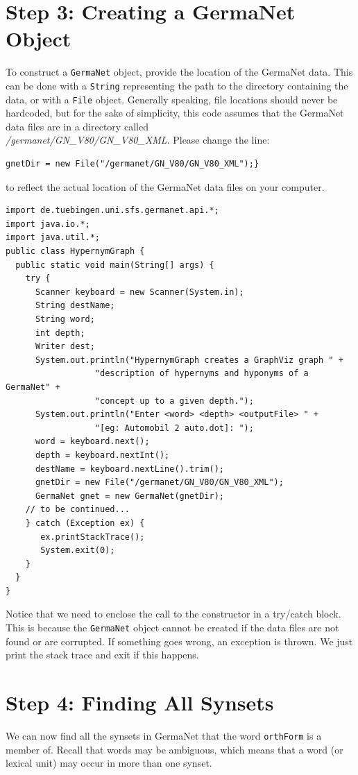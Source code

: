 \documentclass[12pt,a4paper,english,utf8]{report}
\begin{document}
\section{Step 3: Creating a GermaNet Object}
To construct a \texttt{GermaNet} object, provide the location of the GermaNet data. This can be done with a \texttt{String} representing the path to the directory containing the data, or with a \texttt{File} object. Generally speaking, file locations should never be hardcoded, but for the sake of simplicity, this code assumes that the GermaNet data files are in a directory called \\ \emph{/germanet/GN\_V80/GN\_V80\_XML}. Please change the line:

\begin{lstlisting}
gnetDir = new File("/germanet/GN_V80/GN_V80_XML");}
\end{lstlisting}

to reflect the actual location of the GermaNet data files on your computer.

\begin{lstlisting}
import de.tuebingen.uni.sfs.germanet.api.*;
import java.io.*;
import java.util.*;
public class HypernymGraph {
  public static void main(String[] args) {
    try {
      Scanner keyboard = new Scanner(System.in);
      String destName;
      String word;
      int depth;
      Writer dest;
      System.out.println("HypernymGraph creates a GraphViz graph " +
                  "description of hypernyms and hyponyms of a GermaNet" +
                  "concept up to a given depth.");
      System.out.println("Enter <word> <depth> <outputFile> " +
                  "[eg: Automobil 2 auto.dot]: ");
      word = keyboard.next();
      depth = keyboard.nextInt();
      destName = keyboard.nextLine().trim();
      gnetDir = new File("/germanet/GN_V80/GN_V80_XML");
      GermaNet gnet = new GermaNet(gnetDir);
	// to be continued...
    } catch (Exception ex) {
       ex.printStackTrace();
       System.exit(0);
    }
  }
}
\end{lstlisting}

Notice that we need to enclose the call to the constructor in a try/catch block. This is because the \texttt{GermaNet} object cannot be created if the data files are not found or are corrupted. If something goes wrong, an exception is thrown. We just print the stack trace and exit if this happens.



\section{Step 4: Finding All Synsets}
We can now find all the synsets in GermaNet that the word \texttt{orthForm} is a member of. Recall that words may be ambiguous, which means that a word (or lexical unit) may occur in more than one synset.
\end{document}
